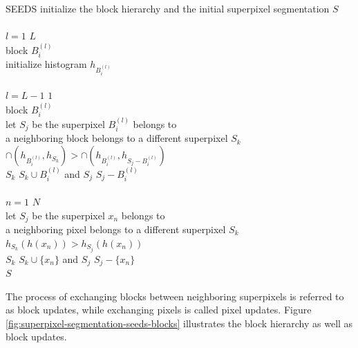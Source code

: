 \begin{algorithm}[t]
	\begin{algo}{SEEDS}{\label{algo:superpixel-segmentation-seeds}}
		initialize the block hierarchy and the initial superpixel segmentation $S$\\
		\\
		\qfor $l = 1$ \qto $L$\\
			\qforeach block $B_i^{(l)}$ \\
				initialize histogram $h_{B_i^{(l)}}$\qrof\qrof\\
		\\
		\qfor $l = L - 1$ \qto $1$\\
			\qforeach block $B_i^{(l)}$\\
				let $S_j$ be the superpixel $B_i^{(l)}$ belongs to\\
				\qif a neighboring block belongs to a different superpixel $S_k$\\
					\qthen \qif $\cap(h_{B_i^{(l)}}, h_{S_k}) > \cap(h_{B_i^{(l)}}, h_{S_j - B_i^{(l)}})$\\
						\qthen $S_k$ \qlet $S_k \cup B_i^{(l)}$ and $S_j$ \qlet $S_j - B_i^{(l)}$\qfi\qfi\qrof\qrof\\
		\\
		\qfor $n = 1$ \qto $N$\\
			let $S_j$ be the superpixel $x_n$ belongs to\\
			\qif a neighboring pixel belongs to a different superpixel $S_k$\\
				\qthen\qif $h_{S_k}(h(x_n)) > h_{S_j}(h(x_n))$\label{line:superpixel-segmentation-seeds-pixel-criterion}\\
					\qthen $S_k$ \qlet $S_k \cup \{x_n\}$ and $S_j$ \qlet $S_j - \{x_n\}$\qfi\qfi\qrof\\
		\qreturn $S$
	\end{algo}
	\caption[The basic algorithm of \textbf{SEEDS} \cite{VanDenBerghBoixRoigCapitaniVanGool:2012}.]{The basic algorithm of \textbf{SEEDS}.}
	\label{fig:superpixel-segmentation-seeds-algorithm}
\end{algorithm}
The process of exchanging blocks between neighboring superpixels is referred to as block updates, while exchanging pixels is called pixel updates. Figure \ref{fig:superpixel-segmentation-seeds-blocks} illustrates the block hierarchy as well as block updates.
